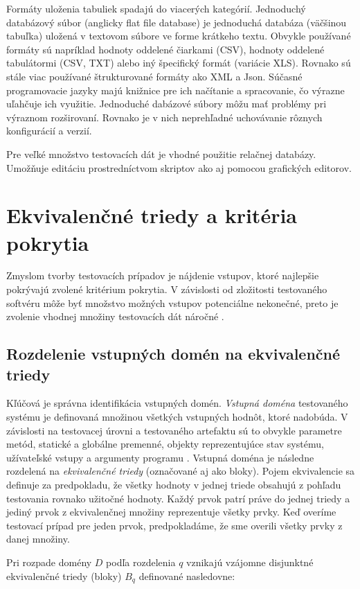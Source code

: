 Formáty uloženia tabuliek spadajú do viacerých kategórií. Jednoduchý databázový súbor (anglicky flat file database) je jednoduchá databáza (väčšinou tabuľka) uložená v textovom súbore ve forme krátkeho textu. Obvykle používané formáty sú napríklad hodnoty oddelené čiarkami (CSV), hodnoty oddelené tabulátormi (CSV, TXT) alebo iný špecifický formát (variácie XLS). Rovnako sú stále viac používané štrukturované formáty ako XML a Json. Súčasné programovacie jazyky majú knižnice pre ich načítanie a spracovanie, čo výrazne uľahčuje ich využitie. Jednoduché dabázové súbory môžu mať problémy pri výraznom rozširovaní. Rovnako je v nich neprehľadné uchovávanie rôznych konfigurácií a verzií. 

Pre veľké množstvo testovacích dát je vhodné použitie relačnej databázy. Umožňuje editáciu prostredníctvom skriptov ako aj pomocou grafických editorov.       


\section{Ekvivalenčné triedy a kritéria pokrytia}
\label{ekv_tr}
Zmyslom tvorby testovacích prípadov je nájdenie vstupov, ktoré najlepšie pokrývajú zvolené kritérium pokrytia. V závislosti od zložitosti testovaného softvéru môže byť množstvo možných vstupov  potenciálne nekonečné, preto je zvolenie vhodnej množiny testovacích dát náročné \cite{Gst}.
\subsection*{Rozdelenie vstupných domén na ekvivalenčné triedy}
Kľúčová je správna identifikácia vstupných domén. {\it Vstupná doména} testovaného systému je definovaná množinou všetkých vstupných hodnôt, ktoré nadobúda. V závislosti na testovacej úrovni a testovaného artefaktu sú to obvykle parametre metód, statické a globálne premenné, objekty reprezentujúce stav systému, užívateľské vstupy a argumenty programu \cite{Ist}. Vstupná doména je následne rozdelená na {\it ekvivalenčné triedy} (označované aj ako bloky). Pojem ekvivalencie sa definuje za predpokladu, že všetky hodnoty v jednej triede obsahujú z pohľadu testovania rovnako užitočné hodnoty. Každý prvok patrí práve do jednej triedy a jediný prvok z ekvivalenčnej množiny reprezentuje všetky prvky. Keď overíme testovací prípad pre jeden prvok, predpokladáme, že sme overili všetky prvky z danej množiny. 

Pri rozpade domény \(D\) podľa rozdelenia \(q\) vznikajú vzájomne disjunktné ekvivalenčné triedy (bloky) \(B_{q}\)  definované nasledovne:

